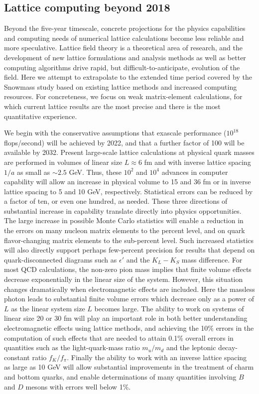 \subsection{Lattice computing beyond 2018}
\label{subsec:lqcd:future}

Beyond the five-year timescale, concrete projections for the physics
capabilities and computing needs of numerical lattice calculations become less
reliable and more speculative.  Lattice field theory is a theoretical area of
research, and the development of new lattice formulations and analysis methods
as well as better computing algorithms drive rapid, but
difficult-to-anticipate, evolution of the field.  Here we attempt to
extrapolate to the extended time period covered by the Snowmass study based on
existing lattice methods and increased computing resources.  For concreteness,
we focus on weak matrix-element calculations, for which current lattice
results are the most precise and there is the most quantitative experience.

We begin with the conservative assumptions that exascale performance
($10^{18}$ flops/second) will be achieved by 2022, and that a further factor
of 100 will be available by 2032.  Present large-scale lattice calculations at
physical quark masses are performed in volumes of linear size $L \approx 6$ fm
and with inverse lattice spacing $1/a$ as small as $\sim 2.5$ GeV.  Thus,
these $10^2$ and $10^4$ advances in computer capability will allow an increase
in physical volume to 15 and 36 fm or in inverse lattice spacing to 5 and 10
GeV, respectively.  Statistical errors can be reduced by a factor of ten, or
even one hundred, as needed.  These three directions of substantial increase
in capability translate directly into physics opportunities.  The large
increase in possible Monte Carlo statistics will enable a reduction in the
errors on many nucleon matrix elements to the percent level, and on quark
flavor-changing matrix elements to the sub-percent level.  Such increased
statistics will also directly support perhaps few-percent precision for
results that depend on quark-disconnected diagrams such as $\epsilon'$ and the
$K_L-K_S$ mass difference.  For most QCD calculations, the non-zero pion mass
implies that finite volume effects decrease exponentially in the linear size
of the system.  However, this situation changes dramatically when
electromagnetic effects are included.  Here the massless photon leads to
substantial finite volume errors which decrease only as a power of $L$ as the
linear system size $L$ becomes large.  The ability to work on systems of
linear size 20 or 30 fm will play an important role in both better
understanding electromagnetic effects using lattice methods, and achieving the
10\% errors in the computation of such effects that are needed to attain 0.1\%
overall errors in quantities such as the light-quark-mass ratio $m_u/m_d$ and
the leptonic decay-constant ratio $f_K/f_\pi$.  Finally the ability to work
with an inverse lattice spacing as large as 10 GeV will allow substantial
improvements in the treatment of charm and bottom quarks, and enable
determinations of many quantities involving $B$ and $D$ mesons with errors
well below 1\%.

